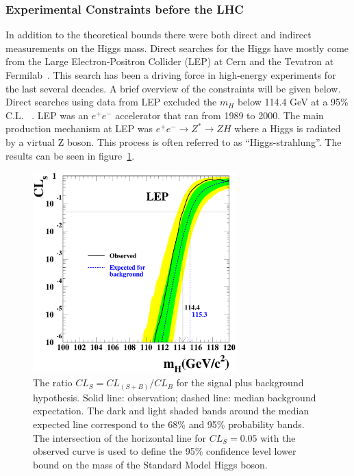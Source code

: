 \subsubsection{Experimental Constraints before the LHC}

In addition to the theoretical bounds there were both direct and indirect measurements on the Higgs mass. Direct searches for the Higgs have mostly come from the Large Electron-Positron Collider (LEP) at Cern and the Tevatron at Fermilab~\cite{ALEPH:2010aa}. This search has been a driving force in high-energy experiments for the last several decades.  A brief overview of the constraints will be given below.
 Direct searches using data from LEP excluded the $m_H$ below 114.4 GeV at a 95\% C.L. ~\cite{Barate:2003sz}. LEP was an $e^+e^-$ accelerator that ran from 1989 to 2000. The main production mechanism at LEP was $e^+e^- \rightarrow Z^* \rightarrow ZH$ where a Higgs is radiated by a virtual Z boson.  This process is often referred to as ``Higgs-strahlung''.  The results can be seen in figure~\ref{fig:adlocls}.

\begin{figure}[htb]
\centering
\includegraphics[width=0.7\textwidth]{StandardModel/fig9.eps}
\caption{\small The ratio $CL_S=CL_{(S+B)}/CL_B$
 for the signal plus background hypothesis. Solid line: observation; dashed line:
median background expectation. The dark and light shaded bands around the median
expected line correspond to the 68\% and 95\% probability bands. The intersection of the horizontal line 
for 
$CL_S = 0.05$
 with the observed curve is used to define the 95\%
confidence level
lower bound on the mass of the Standard Model Higgs boson.~\cite{Barate:2003sz} }
\label{fig:adlocls}
\end{figure}

